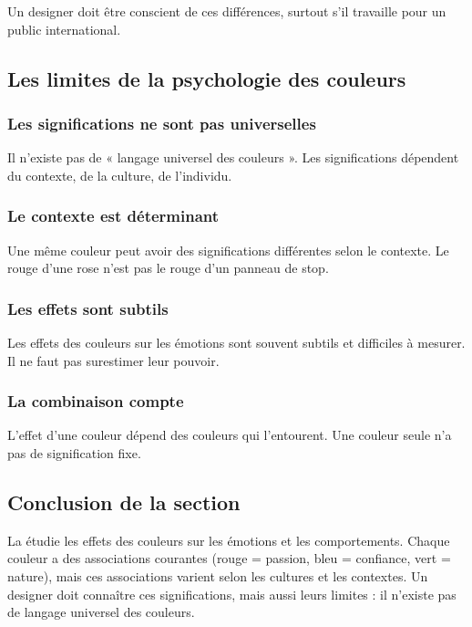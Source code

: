 Un designer doit être conscient de ces différences, surtout s'il travaille pour un public international.

\subsection{Les limites de la psychologie des couleurs}

\subsubsection{Les significations ne sont pas universelles}

Il n'existe pas de « langage universel des couleurs ». Les significations dépendent du contexte, de la culture, de l'individu.

\subsubsection{Le contexte est déterminant}

Une même couleur peut avoir des significations différentes selon le contexte. Le rouge d'une rose n'est pas le rouge d'un panneau de stop.

\subsubsection{Les effets sont subtils}

Les effets des couleurs sur les émotions sont souvent subtils et difficiles à mesurer. Il ne faut pas surestimer leur pouvoir.

\subsubsection{La combinaison compte}

L'effet d'une couleur dépend des couleurs qui l'entourent. Une couleur seule n'a pas de signification fixe.

\subsection*{Conclusion de la section}

\begin{retenir}
La  étudie les effets des couleurs sur les émotions et les comportements. Chaque couleur a des associations courantes (rouge = passion, bleu = confiance, vert = nature), mais ces associations varient selon les cultures et les contextes. Un designer doit connaître ces significations, mais aussi leurs limites : il n'existe pas de langage universel des couleurs.
\end{retenir}

